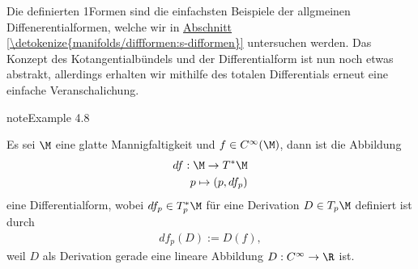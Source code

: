 \documentclass[letterpaper,10pt,german]{jupyterBook}
\begin{document}
\sphinxAtStartPar
Die definierten 1\sphinxhyphen{}Formen sind die einfachsten Beispiele der allgmeinen Diffenerentialformen, welche wir in \hyperref[\detokenize{manifolds/diffformen:s-difformen}]{Abschnitt \ref{\detokenize{manifolds/diffformen:s-difformen}}} untersuchen werden. Das Konzept des Kotangentialbündels und der Differentialform ist nun noch etwas abstrakt, allerdings erhalten wir mithilfe des totalen Differentials {\hyperref[\detokenize{manifolds/tangential:def:totdiff}]{}} erneut eine einfache Veranschalichung.
\label{manifolds/tangential:ex:totdiff}
\begin{sphinxadmonition}{note}{Example 4.8}



\sphinxAtStartPar
Es sei \(\M\) eine glatte Mannigfaltigkeit und \(f\in C^\infty(\M)\), dann ist die Abbildung
\begin{equation*}
\begin{split}df:\M\to T^\ast\M\\
p\mapsto (p, df_p)\end{split}
\end{equation*}
\sphinxAtStartPar
eine Differentialform, wobei \(df_p\in T_p^\ast\M\) für eine Derivation \(D\in T_p\M\) definiert ist durch
\begin{equation*}
\begin{split}df_p(D) := D(f),\end{split}
\end{equation*}
\sphinxAtStartPar
weil \(D\) als Derivation gerade eine lineare Abbildung \(D:C^\infty\to\R\) ist.


\end{sphinxadmonition}
\end{document}
